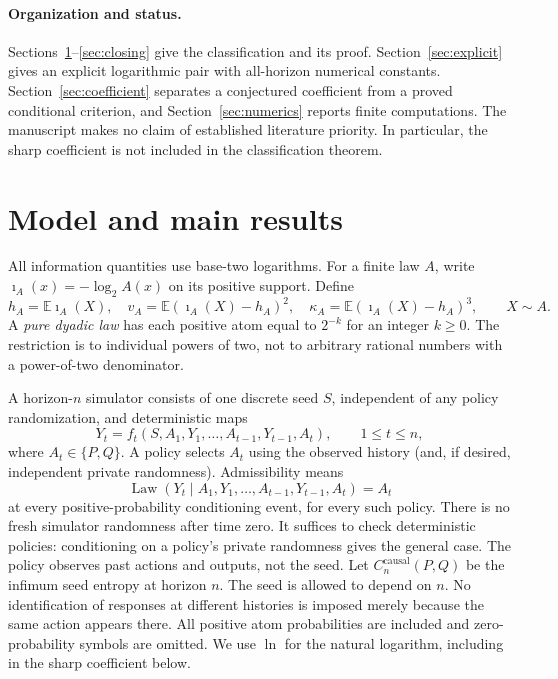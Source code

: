 \documentclass[11pt,a4paper]{article}
\numberwithin{equation}{section}
\newcommand{\E}{\mathbb E}
\newcommand{\Law}{\operatorname{Law}}
\newcommand{\ii}{\imath}
\begin{document}
\paragraph{Organization and status.}
Sections~\ref{sec:main}--\ref{sec:closing} give the classification and its
proof. Section~\ref{sec:explicit} gives an explicit logarithmic pair with
all-horizon numerical constants. Section~\ref{sec:coefficient} separates
a conjectured coefficient from a proved conditional criterion, and
Section~\ref{sec:numerics} reports finite computations. The manuscript
makes no claim of established literature priority. In particular, the
sharp coefficient is not included in the classification theorem.

\section{Model and main results}\label{sec:main}

All information quantities use base-two logarithms. For a finite law $A$,
write $\ii_A(x)=-\log_2 A(x)$ on its positive support. Define
\[
h_A=\E\ii_A(X),\quad
v_A=\E(\ii_A(X)-h_A)^2,\quad
\kappa_A=\E(\ii_A(X)-h_A)^3,\qquad X\sim A.
\]
A \emph{pure dyadic law} has each positive atom equal to $2^{-k}$ for an
integer $k\ge0$. The restriction is to individual powers of two, not to
arbitrary rational numbers with a power-of-two denominator.

A horizon-$n$ simulator consists of one discrete seed $S$, independent
of any policy randomization, and deterministic maps
\[
Y_t=f_t(S,A_1,Y_1,\ldots,A_{t-1},Y_{t-1},A_t),\qquad 1\le t\le n,
\]
where $A_t\in\{P,Q\}$. A policy selects $A_t$ using the observed
history (and, if desired, independent private randomness). Admissibility
means
\[
\Law(Y_t\mid A_1,Y_1,\ldots,A_{t-1},Y_{t-1},A_t)=A_t
\]
at every positive-probability conditioning event, for every such policy.
There is no fresh simulator randomness after time zero. It suffices to
check deterministic policies: conditioning on a policy's private
randomness gives the general case. The policy observes past actions and outputs, not the seed.
Let $C_n^{\mathrm{causal}}(P,Q)$ be the infimum seed entropy at horizon $n$.
The seed is allowed to depend on $n$.
No identification of responses at different histories is imposed merely
because the same action appears there. All positive atom probabilities
are included and zero-probability symbols are omitted. We use $\ln$ for
the natural logarithm, including in the sharp coefficient below.
\end{document}
